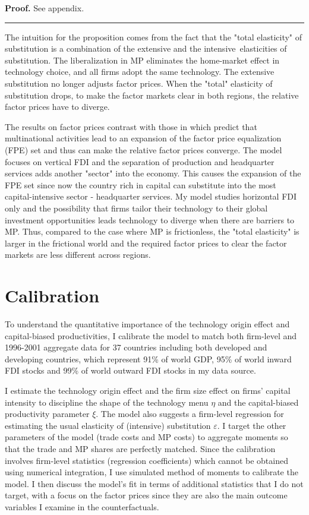 \documentclass[notitlepage,11pt]{article}%
\newenvironment{proof}[1][Proof]{\noindent \textbf{#1.} }{\  \rule{0.5em}{0.5em}}
\begin{document}
\begin{proof}
See appendix.
\end{proof}

The intuition for the proposition comes from the fact that the "total
elasticity" of substitution is a combination of the extensive and the
intensive\ elasticities of substitution. The liberalization in MP eliminates
the home-market effect in technology choice, and all firms adopt the same
technology. The extensive substitution no longer adjusts factor prices. When
the "total" elasticity of substitution drops, to make the factor markets clear
in both regions, the relative factor prices have to diverge.

The results on factor prices contrast with those in \cite{helpman_simple_1984}
which predict that multinational activities lead to an expansion of the factor
price equalization (FPE) set and thus can make the relative factor prices
converge. The \cite{helpman_simple_1984} model focuses on vertical FDI and the
separation of production and headquarter services adds another "sector" into
the economy. This causes the expansion of the FPE set since now the country
rich in capital can substitute into the most capital-intensive sector -
headquarter services. My model studies horizontal FDI only and the possibility
that firms tailor their technology to their global investment opportunities
leads technology to diverge when there are barriers to MP. Thus, compared to
the case where MP is frictionless, the "total elasticity" is larger in the
frictional world and the required factor prices to clear the factor markets
are less different across regions.

\section{Calibration}

To understand the quantitative importance of the technology origin effect and
capital-biased productivities, I calibrate the model to match both firm-level
and 1996-2001 aggregate data for 37 countries including both developed and
developing countries, which represent 91\% of world GDP, 95\% of world inward
FDI stocks and 99\% of world outward FDI stocks in my data source.

I estimate the technology origin effect and the firm size effect on firms'
capital intensity to discipline the shape of the technology menu $\eta$ and
the capital-biased productivity parameter $\xi$. The model also suggests a
firm-level regression for estimating the usual elasticity of (intensive)
substitution $\varepsilon$. I target the other parameters of the model (trade
costs and MP costs) to aggregate moments so that the trade and MP shares are
perfectly matched. Since the calibration involves firm-level statistics
(regression coefficients) which cannot be obtained using numerical
integration, I use simulated method of moments to calibrate the model. I then
discuss the model's fit in terms of additional statistics that I do not
target, with a focus on the factor prices since they are also the main outcome
variables I examine in the counterfactuals.
\end{document}
